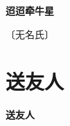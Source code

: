 \documentclass[12pt,UTF-8,openany,fontset=none]{ctexbook}
\begin{document}

\begin{center}
    {\bfseries 迢迢牵牛星}
\end{center}

\begin{center}
    \vspace{10pt}
    
    \begin{large}
        
        〔无名氏〕
        
    \end{large}
    
    \vspace{8pt}
    
    \begin{huge}
        
        \phantom{。}

        \phantom{。}
        
        \phantom{。}

        \phantom{。}
        
        \phantom{。}

        \phantom{。}
        
        \phantom{。}

        \phantom{。}
        
        \phantom{。}

        \phantom{。}
        
    \end{huge}
    
\end{center}

\vspace{8pt}
\clearpage

\section{送友人}



\begin{center}
    {\bfseries 送友人}
\end{center}
\end{document}

